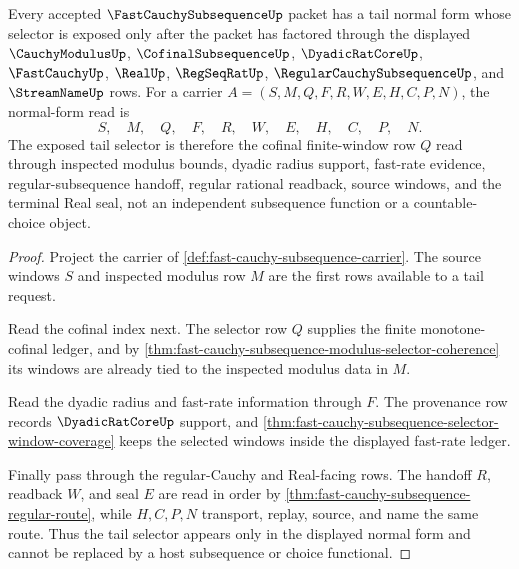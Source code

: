 \begin{theorem}
\label{thm:fast-cauchy-subsequence-tail-normal-form}
Every accepted $\FastCauchySubsequenceUp$ packet has a tail normal form whose selector is exposed only after the packet has factored through the displayed $\CauchyModulusUp$, $\CofinalSubsequenceUp$, $\DyadicRatCoreUp$, $\FastCauchyUp$, $\RealUp$, $\RegSeqRatUp$, $\RegularCauchySubsequenceUp$, and $\StreamNameUp$ rows. For a carrier $A=(S,M,Q,F,R,W,E,H,C,P,N)$, the normal-form read is
$$
S,\quad M,\quad Q,\quad F,\quad R,\quad W,\quad E,\quad H,\quad C,\quad P,\quad N .
$$
The exposed tail selector is therefore the cofinal finite-window row $Q$ read through inspected modulus bounds, dyadic radius support, fast-rate evidence, regular-subsequence handoff, regular rational readback, source windows, and the terminal Real seal, not an independent subsequence function or a countable-choice object.
\end{theorem}
\begin{proof}
Project the carrier of \autoref{def:fast-cauchy-subsequence-carrier}. The source windows $S$ and inspected modulus row $M$ are the first rows available to a tail request.

Read the cofinal index next. The selector row $Q$ supplies the finite monotone-cofinal ledger, and by \autoref{thm:fast-cauchy-subsequence-modulus-selector-coherence} its windows are already tied to the inspected modulus data in $M$.

Read the dyadic radius and fast-rate information through $F$. The provenance row records $\DyadicRatCoreUp$ support, and \autoref{thm:fast-cauchy-subsequence-selector-window-coverage} keeps the selected windows inside the displayed fast-rate ledger.

Finally pass through the regular-Cauchy and Real-facing rows. The handoff $R$, readback $W$, and seal $E$ are read in order by \autoref{thm:fast-cauchy-subsequence-regular-route}, while $H,C,P,N$ transport, replay, source, and name the same route. Thus the tail selector appears only in the displayed normal form and cannot be replaced by a host subsequence or choice functional.
\end{proof}

